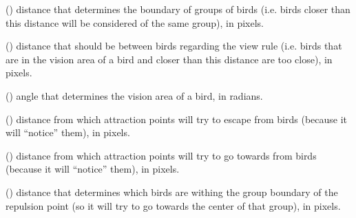 \documentclass[a4paper,11pt,oneside,english]{sphinxmanual}
\begin{document}
\begin{fulllineitems}
() distance that determines the boundary of groups of birds (i.e. birds closer than this distance will be considered of the same group), in pixels.

\end{fulllineitems}



\begin{fulllineitems}
() distance that should be between birds regarding the view rule (i.e. birds that are in the vision area of a bird and closer than this distance are too close), in pixels.

\end{fulllineitems}



\begin{fulllineitems}
() angle that determines the vision area of a bird, in radians.

\end{fulllineitems}


\bigskip 
\bigskip 


\begin{fulllineitems}
() distance from which attraction points will try to escape from birds (because it will “notice” them), in pixels.

\end{fulllineitems}



\begin{fulllineitems}
() distance from which attraction points will try to go towards from birds (because it will “notice” them), in pixels.

\end{fulllineitems}



\begin{fulllineitems}
() distance that determines which birds are withing the group boundary of the repulsion point (so it will try to go towards the center of that group), in pixels.

\end{fulllineitems}
\end{document}
